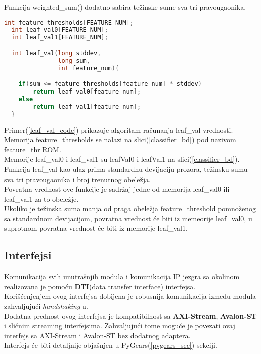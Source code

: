 Funkcija weighted\_sum() dodatno sabira težinske sume sva tri pravougaonika.

\newpage

\begin{lstlisting}[language=C++,caption={Leaf\_val u \textbf{C}-u},captionpos=b, label=leaf_val_code]
  int feature_thresholds[FEATURE_NUM];
  int leaf_val0[FEATURE_NUM];
  int leaf_val1[FEATURE_NUM];

  int leaf_val(long stddev,
               long sum,
               int feature_num){

    if(sum <= feature_thresholds[feature_num] * stddev)
        return leaf_val0[feature_num];
    else
        return leaf_val1[feature_num];
  }
\end{lstlisting}

Primer(\ref{leaf_val_code}) prikazuje algoritam računanja leaf\_val vrednosti. \\
Memorija feature\_thresholds se nalazi na slici(\ref{classifier_bd}) pod nazivom
feature\_thr ROM. \\
Memorije leaf\_val0 i leaf\_val1 su leafVal0 i leafVal1 na
slici(\ref{classifier_bd}). \\

Funkcija leaf\_val kao ulaz prima standardnu devijaciju prozora, težinsku sumu
sva tri pravougaonika i broj trenutnog obeležja. \\
Povratna vrednost ove funkcije je sadržaj jedne od memorija leaf\_val0 ili
leaf\_val1 za to obeležje. \\

Ukoliko je težinska suma manja od praga obeležja feature\_threshold
pomnoženog sa standardnom devijacijom, povratna vrednost će biti iz memeorije
leaf\_val0, u suprotnom povratna vrednost će biti iz memorije leaf\_val1.

\subsection{Interfejsi}

Komunikacija svih unutrašnjih modula i komunikacija IP jezgra sa okolinom
realizovana je pomoću \textbf{DTI}(data transfer interface)\cite{PyGears_OSDA} interfejsa. \\
Korišćenjenjem ovog interfejsa dobijena je robusnija komunikacija između
modula zahvaljujući \emph{handshaking}-u. \\

Dodatna prednost ovog interfejsa je kompatibilnost sa \textbf{AXI-Stream}\cite{AXI_INTF}, \textbf{Avalon-ST}\cite{AVALON_INTF}
i sličnim streaming interfejsima. Zahvaljujući tome moguće je povezati ovaj
interfejs sa AXI-Stream i Avalon-ST bez dodatnog adaptera. \\

Interfejs će biti detaljnije objašnjen u PyGears(\ref{pygears_sec}) sekciji.